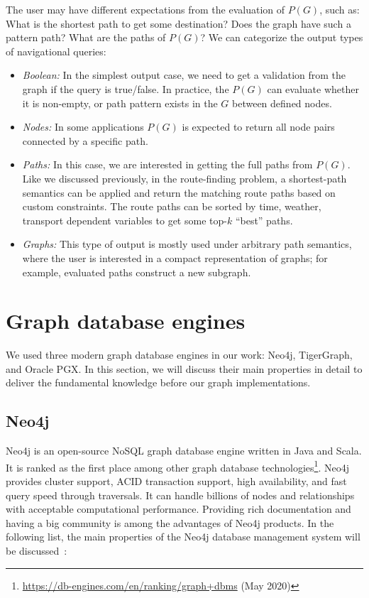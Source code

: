 The user may have different expectations from the evaluation of $P(G)$, such as: 
What is the shortest path to get some destination?
Does the graph have such a pattern path? 
What are the paths of $P(G)$?
We can categorize the output types of navigational queries:

\renewcommand{\labelitemi}{\textendash}
\begin{itemize}
  \item \textit{Boolean:}
  In the simplest output case, we need to get a validation from the graph if the query is true/false.
  In practice, the $P(G)$ can evaluate whether it is non-empty, or path pattern exists in the $G$ between defined nodes.
  \item \textit{Nodes:}
  In some applications $P(G)$ is expected to return all node pairs connected by a specific path.
  \item \textit{Paths:}
  In this case, we are interested in getting the full paths from $P(G)$.
  Like we discussed previously, in the route-finding problem, a shortest-path semantics can be applied and return the matching route paths based on custom constraints.
  The route paths can be sorted by time, weather, transport dependent variables to get some top-$k$ ``best'' paths.
  \item \textit{Graphs:}
  This type of output is mostly used under arbitrary path semantics, where the user is interested in a compact representation of graphs; for example, evaluated paths construct a new subgraph.
\end{itemize}

\section{Graph database engines}

We used three modern graph database engines in our work: Neo4j, TigerGraph, and Oracle PGX.
In this section, we will discuss their main properties in detail to deliver the fundamental knowledge before our graph implementations.

\subsection{Neo4j}

Neo4j is an open-source NoSQL graph database engine written in Java and Scala.
It is ranked as the first place among other graph database technologies\footnote{\url{https://db-engines.com/en/ranking/graph+dbms} (May 2020)}.
Neo4j provides cluster support, ACID transaction support, high availability, and fast query speed through traversals.
It can handle billions of nodes and relationships with acceptable computational performance.
Providing rich documentation and having a big community is among the advantages of Neo4j products.
In the following list, the main properties of the Neo4j database management system will be discussed~\cite{neo4j_website}:

